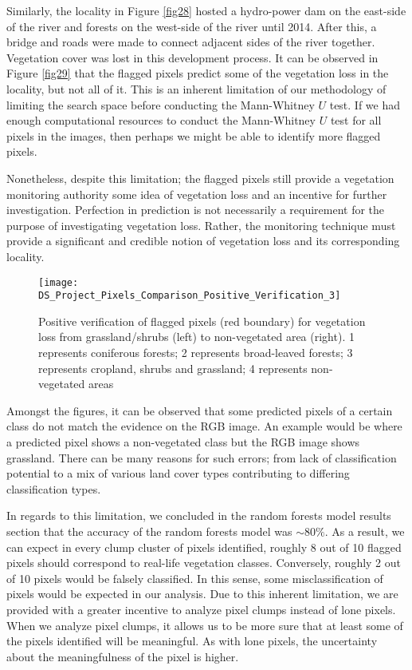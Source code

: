 \justify
Similarly, the locality in Figure \ref{fig28} hosted a hydro-power dam on the east-side of the river and forests on the west-side of the river until 2014. After this, a bridge and roads were made to connect adjacent sides of the river together. Vegetation cover was lost in this development process. It can be observed in Figure \ref{fig29} that the flagged pixels predict some of the vegetation loss in the locality, but not all of it. This is an inherent limitation of our methodology of limiting the search space before conducting the Mann-Whitney $U$ test. If we had enough computational resources to conduct the Mann-Whitney $U$ test for all pixels in the images, then perhaps we might be able to identify more flagged pixels. 

\justify
Nonetheless, despite this limitation; the flagged pixels still provide a vegetation monitoring authority some idea of vegetation loss and an incentive for further investigation. Perfection in prediction is not necessarily a requirement for the purpose of investigating vegetation loss. Rather, the monitoring technique must provide a significant and credible notion of vegetation loss and its corresponding locality.

\begin{figure}[H]
	\centering
	\texttt{[image: DS\_Project\_Pixels\_Comparison\_Positive\_Verification\_3]}
	\caption[Positive verification of flagged pixels (red boundary) for vegetation loss from grassland/shrubs (left) to non-vegetated area (right)]{Positive verification of flagged pixels (red boundary) for vegetation loss from grassland/shrubs (left) to non-vegetated area (right). 1 represents coniferous forests; 2 represents broad-leaved forests; 3 represents cropland, shrubs and grassland; 4 represents non-vegetated areas}
	\label{fig27}
\end{figure}

\justify
Amongst the figures, it can be observed that some predicted pixels of a certain class do not match the evidence on the RGB image. An example would be where a predicted pixel shows a non-vegetated class but the RGB image shows grassland. There can be many reasons for such errors; from lack of classification potential to a mix of various land cover types contributing to differing classification types.

\justify
In regards to this limitation, we concluded in the random forests model results section that the accuracy of the random forests model was $\sim$80$\%$. As a result, we can expect in every clump cluster of pixels identified, roughly 8 out of 10 flagged pixels should correspond to real-life vegetation classes. Conversely, roughly 2 out of 10 pixels would be falsely classified. In this sense, some misclassification of pixels would be expected in our analysis. Due to this inherent limitation, we are provided with a greater incentive to analyze pixel clumps instead of lone pixels. When we analyze pixel clumps, it allows us to be more sure that at least some of the pixels identified will be meaningful. As with lone pixels, the uncertainty about the meaningfulness of the pixel is higher.


